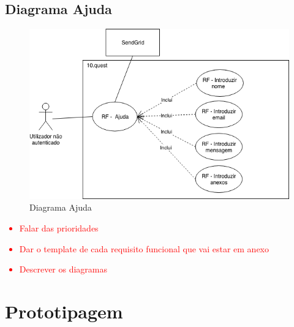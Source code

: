 \subsection{Diagrama Ajuda}
\label{d:ajuda}
\begin{figure}[ht!]
	\begin{center}
		\includegraphics[width=1\textwidth]{img/rf/ajuda}
		\caption{Diagrama Ajuda}
		\label{fig:rf-ajuda}
	\end{center}
\end{figure}


\textcolor{red}{
	\begin{itemize}
		\item Falar das prioridades
		\item Dar o template de cada requisito funcional que vai estar em anexo
		\item Descrever os diagramas
	\end{itemize}	
}

\newpage





\newpage
\section{Prototipagem}
\label{prototipagem}


\blankpage

\glsresetall